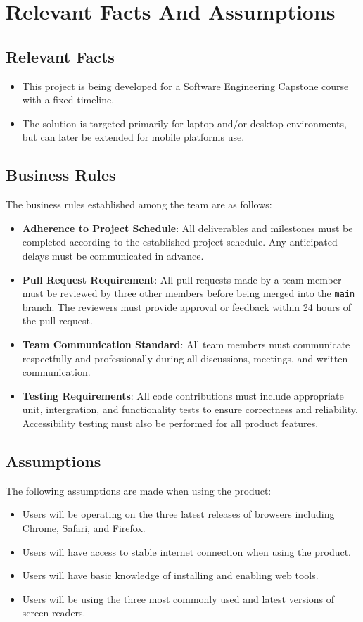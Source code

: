 \documentclass[12pt]{article}
\begin{document}
\section{Relevant Facts And Assumptions}
\subsection{Relevant Facts}
\begin{itemize}
  \item This project is being developed for a Software Engineering Capstone course with a fixed timeline.
  \item The solution is targeted primarily for laptop and/or desktop environments, but can later be extended for mobile platforms use.
\end{itemize}
\subsection{Business Rules}
The business rules established among the team are as follows: 
\begin{itemize}
  \item \textbf{Adherence to Project Schedule}: All deliverables and milestones must be 
  completed according to the established project schedule. Any anticipated delays must be communicated
  in advance.
  \item \textbf{Pull Request Requirement}: All pull requests made by a team member must be reviewed by 
  three other members before being merged into the \texttt{main} branch. The reviewers must provide approval
  or feedback within 24 hours of the pull request.
  \item \textbf{Team Communication Standard}: All team members must communicate respectfully and professionally during 
  all discussions, meetings, and written communication. 
  \item \textbf{Testing Requirements}: All code contributions must include appropriate unit, intergration, and 
  functionality tests to ensure correctness and reliability. Accessibility testing must also be performed for all
  product features. 
\end{itemize}
\subsection{Assumptions}
The following assumptions are made when using the product:
\begin{itemize}
  \item Users will be operating on the three latest releases of browsers including Chrome, Safari, and Firefox.
  \item Users will have access to stable internet connection when using the product.
  \item Users will have basic knowledge of installing and enabling web tools.
  \item Users will be using the three most commonly used and latest versions of screen readers.
\end{itemize}
\end{document}
